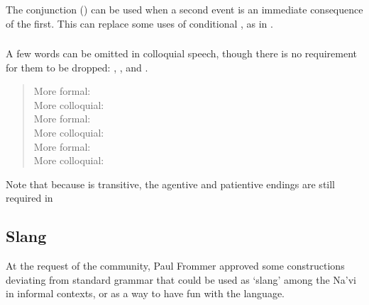 \subsubsection{} The conjunction  () can be
used when a second event is an immediate con\-se\-quence of the first.  This
can replace some uses of conditional , as in  .

\subsubsection{} \label{prag:colloq:omit}
A few words can be omitted in colloquial speech, though there is no
requirement for them to be dropped: , , and .

\begin{quotation}
\noindent More formal:  \\
\noindent More colloquial:   \\

\noindent More formal:  \\
\noindent More colloquial:  \\

\noindent More formal:  \\
\noindent More colloquial:  
\end{quotation}

\noindent Note that because  is transitive, the agentive and
patientive endings are still required in 

\subsection{Slang} At the request of the community, Paul Frommer approved
some constructions deviating from standard grammar that could be used
as `slang' among the Na'vi in informal contexts, or as a way to have
fun with the language.

